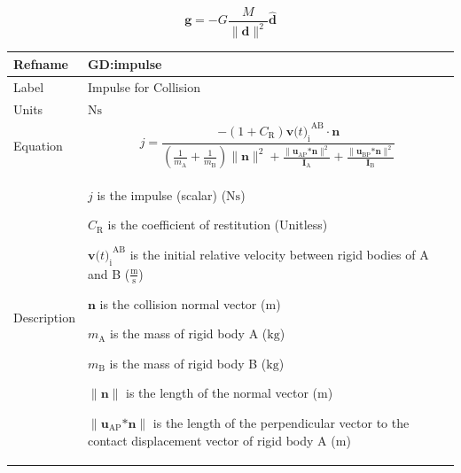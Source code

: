 \documentclass[12pt]{article}
\begin{document}
\begin{displaymath}
\symbf{g}=-G \frac{M}{{\|\symbf{d}\|^{2}}} \symbf{\hat{d}}
\end{displaymath}
\medskip
\noindent
\begin{minipage}{\textwidth}
\begin{tabular}{>{\raggedright}p{}>{\raggedright\arraybackslash}p{}}
\toprule \textbf{Refname} & \textbf{GD:impulse}
\label{GD:impulse}
\\ \midrule
Label & Impulse for Collision
        
\\ \midrule
Units & $\text{N}\text{s}$
        
\\ \midrule
Equation & \begin{displaymath}
           j=\frac{-\left(1+{C_{\text{R}}}\right) {{\symbf{v}\text{(}t\text{)}_{\text{i}}}^{\text{A}\text{B}}}\cdot{}\symbf{n}}{\left(\frac{1}{{m_{\text{A}}}}+\frac{1}{{m_{\text{B}}}}\right) \|\symbf{n}\|^{2}+\frac{\|{\symbf{u}_{\text{A}\text{P}}}\text{*}\symbf{n}\|^{2}}{{\symbf{I}_{\text{A}}}}+\frac{\|{\symbf{u}_{\text{B}\text{P}}}\text{*}\symbf{n}\|^{2}}{{\symbf{I}_{\text{B}}}}}
           \end{displaymath}
\\ \midrule
Description & \begin{symbDescription}
              \item{$j$ is the impulse (scalar) ($\text{N}\text{s}$)}
              \item{${C_{\text{R}}}$ is the coefficient of restitution (Unitless)}
              \item{${{\symbf{v}\text{(}t\text{)}_{\text{i}}}^{\text{A}\text{B}}}$ is the initial relative velocity between rigid bodies of A and B ($\frac{\text{m}}{\text{s}}$)}
              \item{$\symbf{n}$ is the collision normal vector (${\text{m}}$)}
              \item{${m_{\text{A}}}$ is the mass of rigid body A (${\text{kg}}$)}
              \item{${m_{\text{B}}}$ is the mass of rigid body B (${\text{kg}}$)}
              \item{$\|\symbf{n}\|$ is the length of the normal vector (${\text{m}}$)}
              \item{$\|{\symbf{u}_{\text{A}\text{P}}}\text{*}\symbf{n}\|$ is the length of the perpendicular vector to the contact displacement vector of rigid body A (${\text{m}}$)}

\end{symbDescription}
\end{tabular}
\end{minipage}
\end{document}
